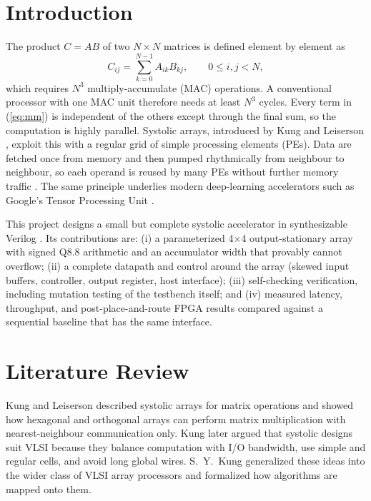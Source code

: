 \documentclass[conference]{IEEEtran}
\begin{document}
\section{Introduction}
The product $C = A B$ of two $N\times N$ matrices is defined element by element as
\begin{equation}
C_{ij} = \sum_{k=0}^{N-1} A_{ik} B_{kj}, \qquad 0 \le i,j < N,
\label{eq:mm}
\end{equation}
which requires $N^3$ multiply-accumulate (MAC) operations. A conventional processor with one MAC unit therefore needs at least $N^3$ cycles. Every term in (\ref{eq:mm}) is independent of the others except through the final sum, so the computation is highly parallel. Systolic arrays, introduced by Kung and Leiserson \cite{kung1979}, exploit this with a regular grid of simple processing elements (PEs). Data are fetched once from memory and then pumped rhythmically from neighbour to neighbour, so each operand is reused by many PEs without further memory traffic \cite{kung1982}. The same principle underlies modern deep-learning accelerators such as Google's Tensor Processing Unit \cite{jouppi2017}.

This project designs a small but complete systolic accelerator in synthesizable Verilog \cite{ieee1364}. Its contributions are:
(i) a parameterized 4$\times$4 output-stationary array with signed Q8.8 arithmetic and an accumulator width that provably cannot overflow;
(ii) a complete datapath and control around the array (skewed input buffers, controller, output register, host interface);
(iii) self-checking verification, including mutation testing of the testbench itself; and
(iv) measured latency, throughput, and post-place-and-route FPGA results compared against a sequential baseline that has the same interface.

\section{Literature Review}
Kung and Leiserson \cite{kung1979} described systolic arrays for matrix operations and showed how hexagonal and orthogonal arrays can perform matrix multiplication with nearest-neighbour communication only. Kung \cite{kung1982} later argued that systolic designs suit VLSI because they balance computation with I/O bandwidth, use simple and regular cells, and avoid long global wires. S.~Y.~Kung \cite{kung1985} generalized these ideas into the wider class of VLSI array processors and formalized how algorithms are mapped onto them.
\end{document}
